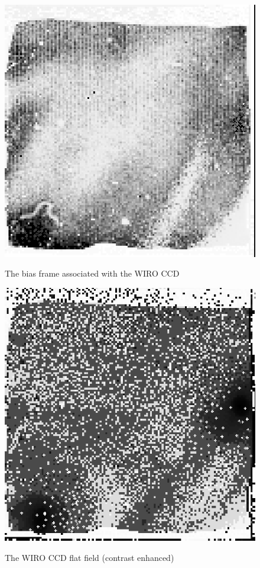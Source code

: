 \documentclass[twoside,11pt]{article}
\begin{document}
\begin{figure}[htbp]
   \centering
   \includegraphics[totalheight=3.5in]{sc5_m51_bias.ps}
   \begin{quote}
   \caption{The bias frame associated with the WIRO CCD
   \label{M51_BIAS} }
   \end{quote}
\end{figure}

\begin{figure}[htbp]
   \centering
   \includegraphics[totalheight=3.5in]{sc5_m51_flat.ps}
   \begin{quote}
   \caption{The WIRO CCD flat field (contrast enhanced)
   \label{M51_FLAT} }
   \end{quote}
\end{figure}
\end{document}
